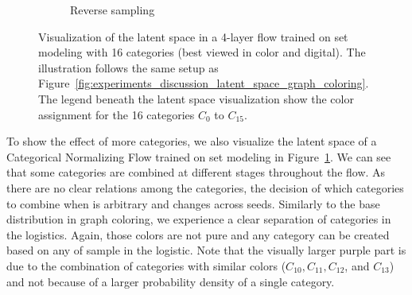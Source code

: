 \begin{figure}[t!]
\begin{subfigure}{\textwidth}
\begin{tabular}{cccc}
        \end{tabular}
        \caption{Reverse sampling\\[0.2cm]}
    \end{subfigure}
    \caption[Latent space of set modeling flow]{Visualization of the latent space in a 4-layer flow trained on set modeling with 16 categories (best viewed in color and digital).
    The illustration follows the same setup as Figure~\ref{fig:experiments_discussion_latent_space_graph_coloring}.
    The legend beneath the latent space visualization show the color assignment for the 16 categories $C_{0}$ to $C_{15}$.}
    \label{fig:experiments_discussion_latent_space_set}
\end{figure}

To show the effect of more categories, we also visualize the latent space of a Categorical Normalizing Flow trained on set modeling in Figure~\ref{fig:experiments_discussion_latent_space_set}. 
We can see that some categories are combined at different stages throughout the flow. 
As there are no clear relations among the categories, the decision of which categories to combine when is arbitrary and changes across seeds.
Similarly to the base distribution in graph coloring, we experience a clear separation of categories in the logistics.
Again, those colors are not pure and any category can be created based on any of sample in the logistic.
Note that the visually larger purple part is due to the combination of categories with similar colors ($C_{10}, C_{11}, C_{12}$, and $C_{13}$) and not because of a larger probability density of a single category.

